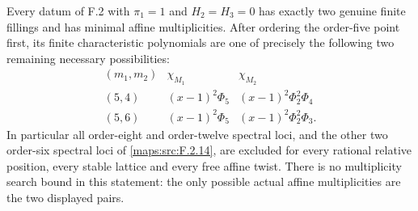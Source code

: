 \begin{theorem}\label{maps:src:F.2.25}


Every datum of F.2 with $\pi_1=1$ and $H_2=H_3=0$ has
exactly two genuine finite fillings and has minimal affine
multiplicities.  After ordering the order-five point first,
its finite characteristic polynomials are one of precisely
the following two remaining necessary possibilities:
\[
\begin{array}{c|c|c}
 (m_1,m_2)&\chi_{M_1}&\chi_{M_2}\\\hline
 (5,4)&(x-1)^2\Phi_5&(x-1)^2\Phi_2^2\Phi_4\\
 (5,6)&(x-1)^2\Phi_5&(x-1)^2\Phi_2^2\Phi_3.
\end{array}
 \tag{F.S1}\label{maps:eq:F.S1}
\]
In particular all order-eight and order-twelve spectral
loci, and the other two order-six spectral loci of \ref{maps:src:F.2.14},
are excluded for every rational relative position, every
stable lattice and every free affine twist.
There is no multiplicity search bound in this statement:
the only possible actual affine multiplicities are the
two displayed pairs.

\end{theorem}


